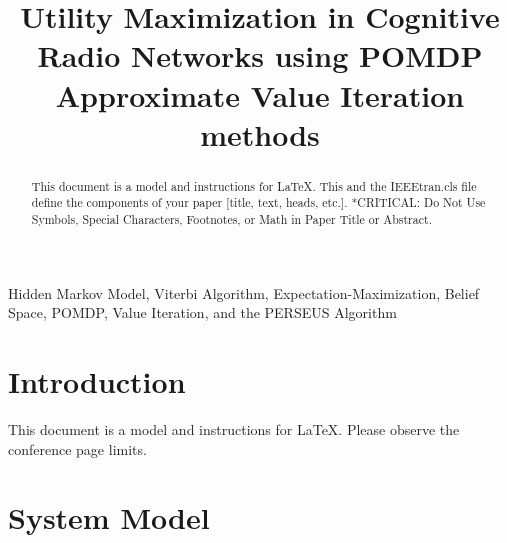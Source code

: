 \documentclass[conference]{IEEEtran}
\begin{document}
\title{Utility Maximization in Cognitive Radio Networks using POMDP Approximate Value Iteration methods}

\author{
\and
{}
}

\maketitle

\begin{abstract}
This document is a model and instructions for \LaTeX.
This and the IEEEtran.cls file define the components of your paper [title, text, heads, etc.]. *CRITICAL: Do Not Use Symbols, Special Characters, Footnotes, 
or Math in Paper Title or Abstract.
\end{abstract}

\begin{IEEEkeywords}
Hidden Markov Model, Viterbi Algorithm, Expectation-Maximization, Belief Space, POMDP, Value Iteration, and the PERSEUS Algorithm
\end{IEEEkeywords}

\section{Introduction}
This document is a model and instructions for \LaTeX.
Please observe the conference page limits. 

\section{System Model}
\end{document}
